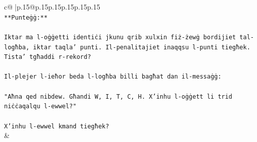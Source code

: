 \documentclass{article}
\begin{document}
{\begin{supertabular}{c@{$\;$}|p{.15\linewidth}@{}p{.15\linewidth}p{.15\linewidth}p{.15\linewidth}p{.15\linewidth}p{.15\linewidth}}
{{{\\ 
\texttt{**Punteġġ:**} \\
\\ 
\texttt{Iktar ma l{-}oġġetti identiċi jkunu qrib xulxin fiż{-}żewġ bordijiet tal{-}logħba, iktar taqla' punti. Il{-}penalitajiet inaqqsu l{-}punti tiegħek. Tista' tgħaddi r{-}rekord?} \\
\\ 
\texttt{Il{-}plejer l{-}ieħor beda l{-}logħba billi bagħat dan il{-}messaġġ:} \\
\\ 
\texttt{"Aħna qed nibdew. Għandi W, I, T, C, H. X'inhu l{-}oġġett li trid niċċaqalqu l{-}ewwel?"} \\
\\ 
\texttt{X'inhu l{-}ewwel kmand tiegħek?} \\
            }
        }
    }
    & \\ \\


\end{supertabular}}
\end{document}
